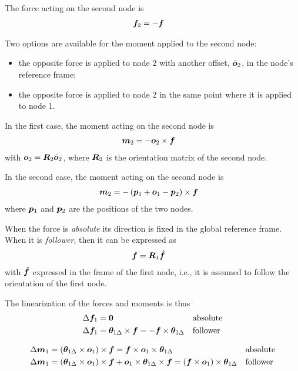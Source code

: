 The force acting on the second node is
\begin{align}
	\bm{f}_2 &= - \bm{f}
\end{align}

Two options are available for the moment applied to the second node:
\begin{itemize}
\item the opposite force is applied to node 2 with another offset, $\tilde{\bm{o}}_2$, in the node's reference frame;
\item the opposite force is applied to node 2 in the same point where it is applied to node 1.
\end{itemize}

In the first case, the moment acting on the second node is
\begin{align}
	\bm{m}_2 &= - \bm{o}_2 \times \bm{f}
\end{align}
with $\bm{o}_2 = \bm{R}_2 \tilde{\bm{o}}_2$, where $\bm{R}_2$ is the orientation matrix of the second node.

In the second case, the moment acting on the second node is
\begin{align}
	\bm{m}_2 &= - \left( \bm{p}_1 + \bm{o}_1 - \bm{p}_2 \right) \times \bm{f}
\end{align}
where $\bm{p}_1$ and $\bm{p}_2$ are the positions of the two nodes.

When the force is \emph{absolute} its direction is fixed in the global reference frame.
When it is \emph{follower}, then it can be expressed as 
\begin{align}
	\bm{f} &= \bm{R}_1 \tilde{\bm{f}}
\end{align}
with $\tilde{\bm{f}}$ expressed in the frame of the first node, i.e., it is assumed to follow the orientation of the first node.

The linearization of the forces and moments is thus
\begin{align}
	\Delta\bm{f}_1
	&=
	\bm{0}
	&& \text{absolute}
	\\
	\Delta\bm{f}_1
	&=
	\bm{\theta}_{1\Delta} \times \bm{f}
	=
	- \bm{f} \times \bm{\theta}_{1\Delta}
	&& \text{follower}
\end{align}

\begin{align}
	\Delta\bm{m}_1
	&=
	\left( \bm{\theta}_{1\Delta} \times \bm{o}_1 \right) \times \bm{f}
	=
	\bm{f} \times \bm{o}_1 \times \bm{\theta}_{1\Delta}
	&& \text{absolute}
	\\
	\Delta\bm{m}_1
	&=
	\left( \bm{\theta}_{1\Delta} \times \bm{o}_1 \right) \times \bm{f} + \bm{o}_1 \times \bm{\theta}_{1\Delta} \times \bm{f}
	=
	\left( \bm{f} \times \bm{o}_1 \right) \times \bm{\theta}_{1\Delta}
	&& \text{follower}
\end{align}

